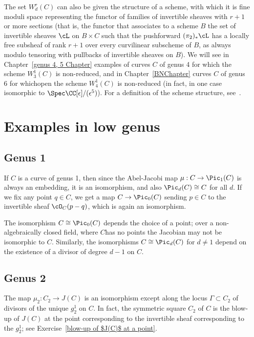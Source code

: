 The set $W^r_d(C)$ can also be given the structure of a scheme, with which it is fine moduli space representing the functor of families of invertible sheaves with $r+1$ or more sections (that is, the functor that associates to a scheme $B$ the set of invertible sheaves $\cL$ on $B \times C$ such that the pushforward $(\pi_2)_*\cL$ has a locally free subsheaf of rank $r+1$ over every curvilinear subscheme of $B$, as always modulo tensoring with pullbacks of invertible sheaves on $B$). We will see in Chapter~\ref{genus 4, 5 Chapter} examples of curves $C$ of genus 4 for which the scheme $W^1_3(C)$ is non-reduced, and in Chapter~\ref{BNChapter} curves $C$ of genus 6 for whichopen the scheme $W^1_4(C)$ is non-reduced (in fact, in one case  isomorphic to $\Spec \CC[\epsilon]/(\epsilon^5)$). For a definition of the scheme structure, see~\cite[Section IV.3]{ACGH}. 

\section{Examples in low genus}

\subsection{Genus 1} 

If $C$ is a curve of genus 1, then since the Abel-Jacobi map $\mu : C \to \Pic_1(C)$ is always an embedding, it is an isomorphism, and also $\Pic_d(C) \cong C$ for all $d$. If we fix any point $q \in C$, we get a map $C \to \Pic_0(C)$ sending $p \in C$ to the invertible sheaf $\cO_C(p-q)$, which is again an isomorphism.

The isomorphism $C \cong \Pic_0(C)$  depends the choice of a point; over a non-algebraically closed field, where $C$has no points the Jacobian may not be isomorphic to $C$. Similarly, the isomorphisms $C \cong \Pic_d(C)$
for $d \neq 1$ depend on the existence of a divisor of degree $d-1$ on $C$.

\subsection{Genus 2}

The map $\mu_2 : C_{2} \to J(C)$ is an isomorphism except along the locus $\Gamma \subset  C_{2} $ of divisors of the unique $g^1_2$ on $C$. In fact, the symmetric square $ C_{2} $ of $C$ is the blow-up of $J(C)$ at the point corresponding to the invertible sheaf corresponding to the
$g^1_2$; see Exercise~\ref{blow-up of $J(C)$ at a point}.


